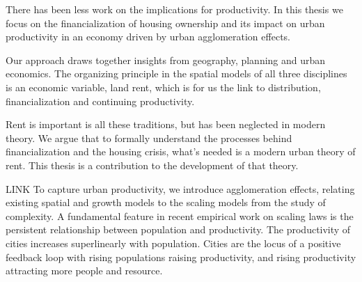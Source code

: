 There has been less work on the implications for productivity. 
In this thesis we focus on the financialization of housing ownership and its impact on urban productivity in an economy driven by urban agglomeration effects. 



Our approach draws together insights from %
geography, planning and urban economics. 
The organizing principle in the spatial models of all three disciplines is an economic variable, land rent, which is for us the link to distribution, financialization and continuing productivity. %

Rent is important is all these traditions, but has been neglected in modern theory. We argue that to formally understand the processes behind financialization and the housing crisis, what's needed is a modern urban theory of rent. This thesis is a contribution to the development of that theory. 

LINK
To capture urban productivity, we introduce %
agglomeration effects, relating existing spatial and growth models to the scaling models from the study of complexity. A fundamental feature in recent empirical work on scaling laws is %
the persistent relationship between population and productivity. The productivity of cities increases superlinearly with population. Cities are the locus of a positive feedback loop with rising populations raising productivity, and rising productivity attracting more people and resource.






